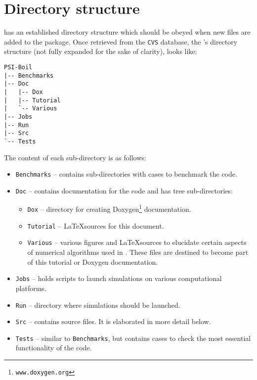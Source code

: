 \section{Directory structure}
\label{sec:directory_structure}

{\psiboil} has an established directory structure which should be obeyed when
new files are added to the package. 
Once retrieved from the {\tt CVS} database, the {\psiboil}'s directory 
structure (not fully expanded for the sake of clarity), looks like:
%
{\small \begin{verbatim}
PSI-Boil
|-- Benchmarks
|-- Doc
|   |-- Dox
|   |-- Tutorial
|   `-- Various
|-- Jobs
|-- Run
|-- Src
`-- Tests
\end{verbatim}}
%
The content of each sub-directory is as follows:
%
\begin{itemize}
  \item {\tt Benchmarks} -- contains sub-directories with cases to benchmark the 
        code. 
  \item {\tt Doc} -- contains documentation for the code and has tree sub-directories:
  \begin{itemize}
    \item {\tt Dox} -- directory for creating Doxygen\footnote{{\tt www.doxygen.org}} 
          documentation.
    \item {\tt Tutorial} -- \LaTeX sources for this document.
    \item {\tt Various} -- various figures and \LaTeX sources to elucidate certain
          aspects of numerical algorithms used in {\psiboil}. These files are 
          destined to become part of this tutorial or Doxygen documentation. 
  \end{itemize}
  \item {\tt Jobs} -- holds scripts to launch {\psiboil} simulations on various
        computational platforms. 
  \item {\tt Run} -- directory where simulations should be launched.
  \item {\tt Src} -- contains source files. It is elaborated in more detail below.
  \item {\tt Tests} -- similar to {\tt Benchmarks}, but contains cases to check the
        most essential functionality of the code. 
\end{itemize}

